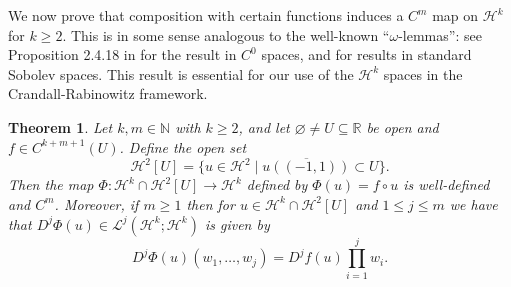 \documentclass[11pt,reqno]{amsart}
\numberwithin{equation}{section}
\def\h{\mathcal{H}}
\def\L{\mathcal{L}}
\def\N{\mathbb{N}}
\def\R{\mathbb{R}}
\def\st{\;\vert\;}
\newtheorem{thm}[lem]{Theorem}
\begin{document}
We now prove that composition with certain functions induces a $C^m$ map on $\h^k$ for $k \ge 2$.  This is in some sense analogous to the well-known ``$\omega$-lemmas'': see Proposition 2.4.18 in \cite{AMR_1988} for the result in $C^0$ spaces, and \cite{IKT_2013} for results in standard Sobolev spaces.  This result is essential for our use of the $\h^k$ spaces in the Crandall-Rabinowitz framework.


\begin{thm}\label{hk_comp_Cm}
Let $k,m \in \N$ with $k \ge 2$, and let $\varnothing \neq U \subseteq \R$ be open and $f \in C^{k+m+1}(U)$.  Define the open set 
\begin{equation}
 \h^2[U] = \{u \in \h^2 \st \overline{u((-1,1))} \subset U \}.
\end{equation}
Then the map $\Phi : \h^k \cap \h^2[U] \to \h^k$ defined by $\Phi(u) = f\circ u$ is well-defined and $C^m$.  Moreover, if $m \ge 1$ then for $u \in \h^k \cap \h^2[U]$ and $1 \le j \le m$ we have that $D^j \Phi(u) \in \L^j(\h^k;\h^k)$ is given by  
\begin{equation}\label{hk_comp_Cm_0}
 D^j\Phi(u) (w_1, \dotsc, w_j)  = D^j f(u) \prod_{i=1}^j w_i.
\end{equation}
\end{thm}
\end{document}
